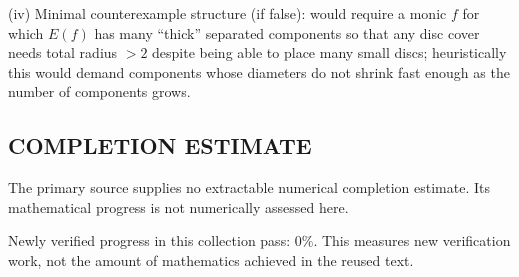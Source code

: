 (iv) Minimal counterexample structure (if false): would require a monic $f$ for which $E(f)$ has many ``thick'' separated components so that any disc cover needs total radius $>2$ despite being able to place many small discs; heuristically this would demand components whose diameters do not shrink fast enough as the number of components grows.




\subsection*{COMPLETION ESTIMATE}
The primary source supplies no extractable numerical completion estimate. Its mathematical progress is not numerically assessed here.

Newly verified progress in this collection pass: $0\%$. This measures new verification work, not the amount of mathematics achieved in the reused text.
